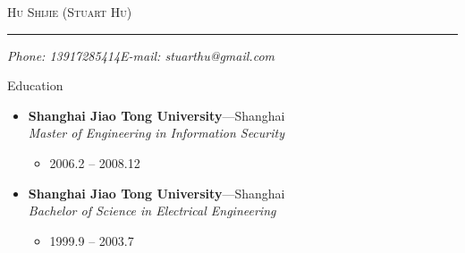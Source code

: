 \documentclass[11pt,oneside]{article}
\makeatletter
\newcommand{\name}{Hu Shijie (Stuart Hu)}
\newcommand{\phone}{Phone: 13917285414}
\newcommand{\email}{E-mail: stuarthu@gmail.com}
\newcommand{\bigname}[1]{
	\begin{center}\selectfont\Huge\scshape#1\end{center}
}
\newenvironment{ressection}[1]{
	\vspace{4pt}
	{\selectfont\Large#1}
	\begin{itemize}
	\vspace{3pt}
}{
	\end{itemize}
}
\newcommand{\ressubitem}[1]{
	\vspace{-1pt}
	\item \begin{flushleft} #1 \end{flushleft}
}
\newcommand{\resbigitem}[3]{
	\vspace{-5pt}
	\item
	\textbf{#1}---#2 \\
	\textit{#3}
}
\newenvironment{ressubsec}[3]{
	\resbigitem{#1}{#2}{#3}
	\vspace{-2pt}
	\begin{itemize}
}{
    \end{itemize}
}
\makeatother
\begin{document}
\bigname{\name}

\vspace{-8pt} \rule{\textwidth}{1pt}

\vspace{-1pt} {\small\itshape \phone \hfill \email}

\vspace{8 pt}


\begin{ressection}{Education}

	\begin{ressubsec}{Shanghai Jiao Tong University}{Shanghai}{Master of Engineering in Information Security}
		\ressubitem{2006.2 -- 2008.12}
	\end{ressubsec}

	\begin{ressubsec}{Shanghai Jiao Tong University}{Shanghai}{Bachelor of Science in Electrical Engineering}
		\ressubitem{1999.9 -- 2003.7}
	\end{ressubsec}

\end{ressection}
\end{document}
